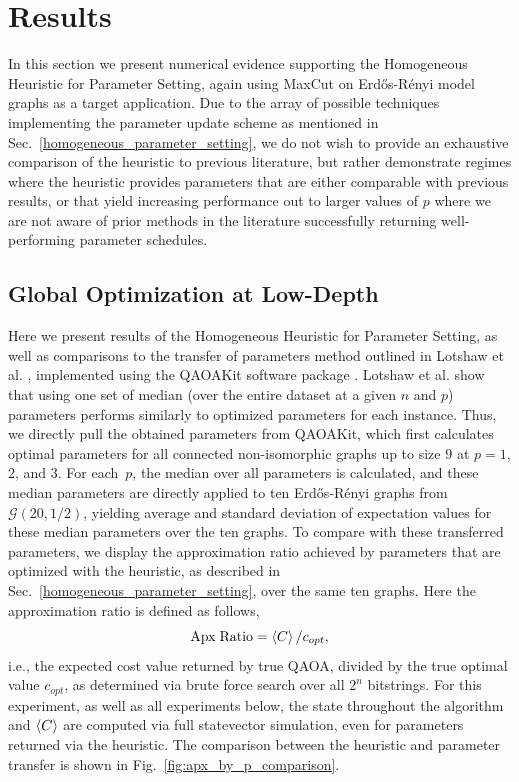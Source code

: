 \documentclass[superscriptaddress,pra,aps,10pt,longbibliography,notitlepage]{revtex4-1}
\begin{document}
\section{Results}\label{results}

In this section we present numerical evidence supporting the Homogeneous Heuristic for Parameter Setting, again using MaxCut on Erd\H{o}s-R\'{e}nyi model graphs as a target application. Due to the array of possible techniques implementing the parameter update scheme as mentioned in Sec.~\ref{homogeneous_parameter_setting}, we do not wish to provide an exhaustive comparison of the heuristic to previous literature, but rather demonstrate regimes where the heuristic provides parameters that are either comparable with previous results, or that yield increasing performance out to larger values of $p$ where we are not aware of prior methods in the literature successfully returning well-performing parameter schedules.


\subsection{Global Optimization at Low-Depth}\label{low_depth}
 
Here we present results of the Homogeneous Heuristic for Parameter Setting, as well as comparisons to the transfer of parameters method outlined in Lotshaw et al. \cite{lotshaw21}, implemented using the QAOAKit software package \cite{shaydulin21_qaoakit}. Lotshaw et al. show that using one set of median (over the entire dataset at a given $n$ and $p$) parameters performs similarly to optimized parameters for each instance. Thus, we directly pull the obtained parameters from QAOAKit, which first calculates optimal parameters for all connected non-isomorphic graphs up to size $9$ at $p=1$,$2$, and $3$. For each~$p$, the median over all parameters is calculated, and these median parameters are directly applied to ten Erd\H{o}s-R\'{e}nyi graphs from $\mathcal{G}(20,1/2)$, yielding average and standard deviation of expectation values for these median parameters over the ten graphs. To compare with these transferred parameters, we display the approximation ratio achieved by parameters that are optimized with the heuristic, as described in Sec.~\ref{homogeneous_parameter_setting}, over the same ten graphs. Here the approximation ratio is defined as follows,
\begin{equation}
    \mathrm{Apx \; Ratio} = \braket{C}/c_{opt},
\end{equation}
i.e., the expected cost value returned by true QAOA, divided by the true optimal value $c_{opt}$, as determined via brute force search over all $2^n$ bitstrings. For this experiment, as well as all experiments below, the state throughout the algorithm and $\braket{C}$ are computed via full statevector simulation, even for parameters returned via the heuristic. The comparison between the  heuristic and parameter transfer is shown in Fig.~\ref{fig:apx_by_p_comparison}. 
\end{document}
